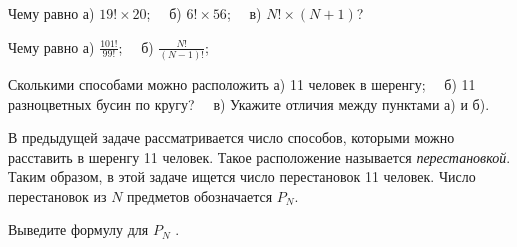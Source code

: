 \begin{ex}\label{u19}
	Чему равно а) $19!\times20$;~~  б) $6!\times56$;~~  в) $N!\times(N + 1)$?
\end{ex}

\begin{ex}\label{u20}
	Чему равно а) $\frac{101!}{99!}$;~~  б) $\frac{N!}{(N-1)!}$;  
\end{ex}

\begin{thm}
	Сколькими способами можно расположить а) 11 человек в шеренгу;~~ б) 11 разноцветных бусин по кругу?~~ в) Укажите отличия между пунктами а) и б).  
\end{thm}

В предыдущей задаче рассматривается число способов, которыми можно расставить в шеренгу 11 человек. Такое расположение называется \textit{перестановкой}. Таким образом, в этой задаче ищется число перестановок 11 человек. Число перестановок из $N$ предметов обозначается $P_N$.

\begin{thm}\label{3.6}
	Выведите формулу для $P_N$ .
\end{thm}